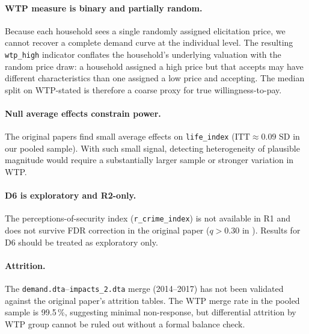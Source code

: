 \documentclass[12pt]{article}
\begin{document}
\paragraph{WTP measure is binary and partially random.}
Because each household sees a single randomly assigned elicitation price,
we cannot recover a complete demand curve at the individual level.
The resulting \texttt{wtp\_high} indicator conflates the household's
underlying valuation with the random price draw: a household assigned
a high price but that accepts may have different characteristics than one
assigned a low price and accepting. The median split on WTP-stated
is therefore a coarse proxy for true willingness-to-pay.

\paragraph{Null average effects constrain power.}
The original papers find small average effects on \texttt{life\_index}
($\text{ITT} \approx 0.09$ SD in our pooled sample). With such small
signal, detecting heterogeneity of plausible magnitude would require
a substantially larger sample or stronger variation in WTP.

\paragraph{D6 is exploratory and R2-only.}
The perceptions-of-security index (\texttt{r\_crime\_index}) is not
available in R1 and does not survive FDR correction in the original
paper ($q > 0.30$ in \citealt{lee2019jpe}). Results for D6 should be
treated as exploratory only.

\paragraph{Attrition.}
The \texttt{demand.dta}--\texttt{impacts\_2.dta} merge (2014--2017)
has not been validated against the original paper's attrition tables.
The WTP merge rate in the pooled sample is 99.5\,\%, suggesting minimal
non-response, but differential attrition by WTP group cannot be ruled
out without a formal balance check.
\end{document}
